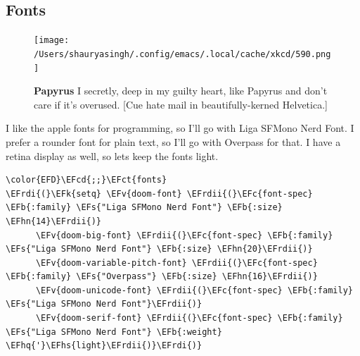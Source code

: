 \documentclass{scrartcl}
\newcommand{\EFk}[1]{\textcolor{EFk}{#1}} %
\newcommand{\EFs}[1]{\textcolor{EFs}{#1}} %
\newcommand{\EFb}[1]{\textcolor{EFb}{#1}} %
\newcommand{\EFct}[1]{\textcolor{EFct}{#1}} %
\newcommand{\EFc}[1]{\textcolor{EFc}{#1}} %
\newcommand{\EFv}[1]{\textcolor{EFv}{#1}} %
\newcommand{\EFcd}[1]{\textcolor{EFcd}{#1}} %
\newcommand{\EFhn}[1]{#1} %
\newcommand{\EFhq}[1]{#1} %
\newcommand{\EFhs}[1]{#1} %
\newcommand{\EFrdi}[1]{#1} %
\newcommand{\EFrdii}[1]{#1} %
\begin{document}
\subsection{Fonts}
\label{sec:org6f534d6}
\begin{figure}[!htb]
	  \centering
	  \texttt{[image: /Users/shauryasingh/.config/emacs/.local/cache/xkcd/590.png]}
  \caption*{\label{xkcd:590} \textbf{Papyrus} I secretly, deep in my guilty heart, like Papyrus and don't care if it's overused. [Cue hate mail in beautifully-kerned Helvetica.]}
	\end{figure}

I like the apple fonts for programming, so I'll go with Liga SFMono Nerd Font. I
prefer a rounder font for plain text, so I'll go with Overpass for that. I have a retina display as well, so lets keep the fonts light.
\begin{Code}
\begin{Verbatim}[]
\color{EFD}\EFcd{;;}\EFct{fonts}
\EFrdi{(}\EFk{setq} \EFv{doom-font} \EFrdii{(}\EFc{font-spec} \EFb{:family} \EFs{"Liga SFMono Nerd Font"} \EFb{:size} \EFhn{14}\EFrdii{)}
      \EFv{doom-big-font} \EFrdii{(}\EFc{font-spec} \EFb{:family} \EFs{"Liga SFMono Nerd Font"} \EFb{:size} \EFhn{20}\EFrdii{)}
      \EFv{doom-variable-pitch-font} \EFrdii{(}\EFc{font-spec} \EFb{:family} \EFs{"Overpass"} \EFb{:size} \EFhn{16}\EFrdii{)}
      \EFv{doom-unicode-font} \EFrdii{(}\EFc{font-spec} \EFb{:family} \EFs{"Liga SFMono Nerd Font"}\EFrdii{)}
      \EFv{doom-serif-font} \EFrdii{(}\EFc{font-spec} \EFb{:family} \EFs{"Liga SFMono Nerd Font"} \EFb{:weight} \EFhq{'}\EFhs{light}\EFrdii{)}\EFrdi{)}
\end{Verbatim}
\end{Code}
\end{document}
